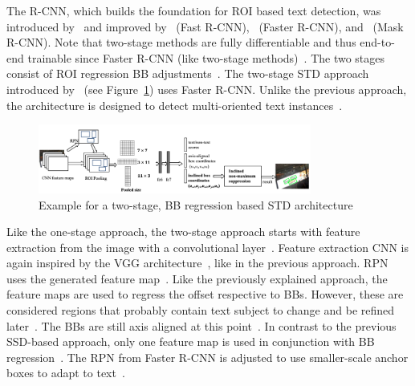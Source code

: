The R-CNN, which builds the foundation for \ac{ROI} based text detection, was introduced
by~\cite{girshick_rich_2014} and improved by~\cite{girshick_fast_2015} (Fast
R-CNN),~\cite{ren_faster_2015} (Faster R-CNN), and~\cite{he_mask_2018} (Mask R-CNN).
Note that two-stage methods are fully differentiable and thus end-to-end trainable since
Faster R-CNN (like two-stage methods)~\citep{ren_faster_2015,long_scene_2021}.
The two stages consist of \ac{ROI} regression \ac{BB}
adjustments~\citep{jiang_r2cnn_2017, ren_faster_2015}.
The two-stage \ac{STD} approach introduced by~\cite{jiang_r2cnn_2017} (see
Figure~\ref{fig:STD-segfree-rcnn}) uses Faster R-CNN.%
Unlike the previous approach, the architecture is designed to detect multi-oriented text
instances~\citep{jiang_r2cnn_2017,liao_textboxes_2017}.
\begin{figure}[ht]
    \centering
    \includegraphics[width=0.8\textwidth]{img/STD-seg-free-Jiang-R2CNN-2017.png}
    \caption[Two-stage, BB regression based STD architecture]{%
        Example for a two-stage, BB regression based STD
        architecture~\citep{jiang_r2cnn_2017}\label{fig:STD-segfree-rcnn}
    }
\end{figure}
Like the one-stage approach, the two-stage approach starts with feature extraction from the
image with a convolutional layer~\citep{jiang_r2cnn_2017}.
Feature extraction \ac{CNN} is again inspired by the VGG architecture~\citep{jiang_r2cnn_2017},
like in the previous approach.
\ac{RPN} uses the generated feature map~\citep{jiang_r2cnn_2017}.
Like the previously explained approach, the feature maps are used to regress the offset
respective to \acp{BB}.
However, these are considered regions that probably contain text subject to change and
be refined later~\citep{jiang_r2cnn_2017,lu_mimicdet_2020}.
The \acp{BB} are still axis aligned at this point~\citep{jiang_r2cnn_2017}.
In contrast to the previous \ac{SSD}-based approach, only one feature map is used in conjunction with
\ac{BB} regression~\citep{jiang_r2cnn_2017}.
The \ac{RPN} from Faster R-CNN is adjusted to use smaller-scale anchor boxes to adapt to
text~\citep{jiang_r2cnn_2017}.
